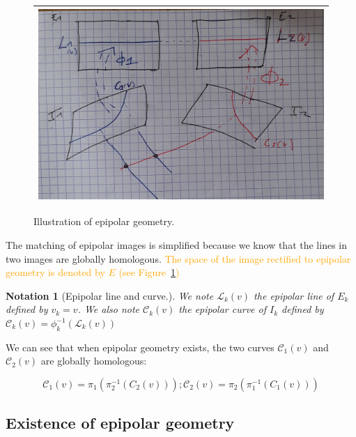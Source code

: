 \documentclass{ipol}
\newcommand{\PiOT}[1]{\pi_1(\pi_2^{-1}(#1))}
\newcommand{\PiTO}[1]{\pi_2(\pi_1^{-1}(#1))}
\newcommand{\LineE}[1]{\ensuremath{\mathcal{L}_{#1}}}
\newcommand{\LineK}{\LineE{k}}
\newcommand{\CurveE}[1]{\ensuremath{\mathcal{C}_{#1}}}
\newcommand{\CurveO}{\CurveE{1}}
\newcommand{\CurveT}{\CurveE{2}}
\newcommand{\CurveK}{\CurveE{k}}
\newtheorem{notation}{Notation}
\newcommand{\er}[1]{\textcolor{orange}{#1}}
\begin{document}
\begin{figure}
\centering
\begin{tabular}{||c||}
 \hline \hline
\includegraphics[width=15cm]{FIGS/Epip.jpg} 
 \\ \hline \hline
\end{tabular}
\caption{Illustration of epipolar geometry.}
\label{FigDefEpip}
\end{figure}


\noindent The matching of epipolar images is simplified because we know that the lines in two images are globally homologous. 
\er{The space of the image rectified to epipolar geometry is denoted by $E$ (see Figure~\ref{FigDefEpip})}


\begin{notation}[Epipolar line and curve.]
We note $\LineK(v)$   the epipolar  line of $E_k$ defined by $v_k=v$. We also note $\CurveK(v)$ the epipolar
curve of $I_k$ defined by $\CurveK(v) = \phi_k^{-1}(\LineK(v))$
\end{notation}
%
\noindent We can see that when epipolar geometry exists, the two curves $\CurveO(v)$ and $\CurveT(v)$ are globally homologous:

\begin{equation}
     \CurveO(v) = \PiOT{C_2(v)}   ;  \CurveT(v) = \PiTO{C_1(v)} \label{Eq:CurvHom}
\end{equation}



\subsection{Existence of epipolar geometry}
\label{ExistEpip}
\end{document}

